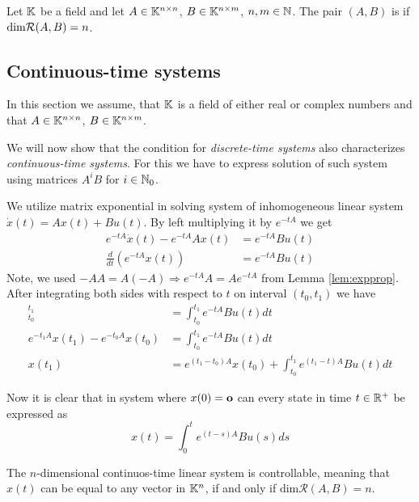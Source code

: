 \begin{definition}
	Let $\mathbb{K}$ be a field and let $A \in \mathbb{K}^{n \times n}$, $B \in \mathbb{K}^{n \times m}$, $n,m \in \mathbb{N}$. The pair $(A,B)$ is  if $\textnormal{dim}\mathcal{R}(A,B)=n$.
\end{definition}

\subsection{Continuous-time systems}

\begin{remark}
	In this section we assume, that $\mathbb{K}$ is a field of either real or complex numbers and that $A\in\mathbb{K}^{n\times n}$, $B\in\mathbb{K}^{n\times m}$.
\end{remark}

We will now show that the condition for \textit{discrete-time systems} also characterizes \textit{continuous-time systems}. For this we have to express solution of such system using matrices $A^iB$ for $i\in \mathbb{N}_0$. 

We utilize matrix exponential in solving system of inhomogeneous linear system $\dot{x}(t)=Ax(t)+Bu(t)$. By left multiplying it by $e^{-tA}$ we get
\begin{align*}
	e^{-tA}\dot{x}(t)-e^{-tA}Ax(t) &=e^{-tA}Bu(t) \\
	\frac{d}{dt} (e^{-tA}x(t)) &=e^{-tA}Bu(t) 
\end{align*}
Note, we used $-AA=A(-A)\Rightarrow e^{-tA}A=Ae^{-tA}$ from Lemma \ref{lem:expprop}. After integrating both sides with respect to $t$ on interval $(t_0,t_1)$ we have 
\begin{align*}
	[e^{-tA}x(t)]^{t_1}_{t_0}&=\int^{t_1}_{t_0}e^{-tA}Bu(t)dt \\
	e^{-t_1A}x(t_1)-e^{-t_0A}x(t_0)&=\int^{t_1}_{t_0}e^{-tA}Bu(t)dt \\
	x(t_1)&=e^{(t_1-t_0)A}x(t_0)+\int^{t_1}_{t_0}e^{(t_1-t)A}Bu(t)dt
\end{align*}

Now it is clear that in system where $x(0)=\textbf{o}$ can every state in time $t\in \mathbb{R}^+$ be expressed as $$x(t)=\int^t_0 e^{(t-s)A}Bu(s)ds$$

\begin{theorem}
	The $n$-dimensional continuos-time linear system is controllable, meaning that $x(t)$ can be equal to any vector in $\mathbb{K}^n$, if and only if $\text{dim}\mathcal{R}(A,B)=n$.
\end{theorem}

